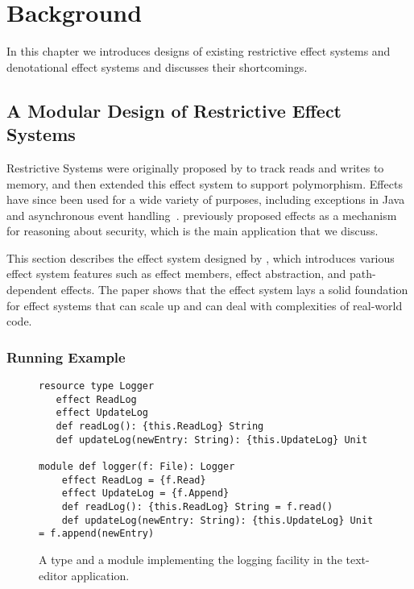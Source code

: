 

\chapter{Background}

In this chapter we introduces designs of existing restrictive effect systems and denotational effect systems and discusses their shortcomings.

\label{chapter-background}
\section{A Modular Design of Restrictive Effect Systems}

\label{sec:wyvern-effects-basics}


Restrictive Systems were originally proposed by \citet{lucassen87} to track reads and writes to memory, and then \citet{lucassen88} extended this effect system to support polymorphism.  Effects have since been used for a wide variety of purposes, including exceptions in Java~\cite{kiniry06} and asynchronous event handling~\cite{bracevac18}. \citet{turbak08} previously proposed effects as a mechanism for reasoning about security, which is the main application that we discuss.

This section describes the effect system designed by \citet{melicher20}, which introduces various effect system features such as effect members, effect abstraction, and path-dependent effects. The paper shows that the effect system lays a solid foundation for effect systems that can scale up and can deal with complexities of real-world code.



\subsection{Running Example}
\begin{figure}[t]
\begin{lstlisting}
resource type Logger
   effect ReadLog
   effect UpdateLog
   def readLog(): {this.ReadLog} String
   def updateLog(newEntry: String): {this.UpdateLog} Unit

module def logger(f: File): Logger
	effect ReadLog = {f.Read}
	effect UpdateLog = {f.Append}
	def readLog(): {this.ReadLog} String = f.read()
	def updateLog(newEntry: String): {this.UpdateLog} Unit = f.append(newEntry)
\end{lstlisting}
\caption{A type and a module implementing the logging facility in the text-editor application.}
\label{f-logger}
\end{figure}

